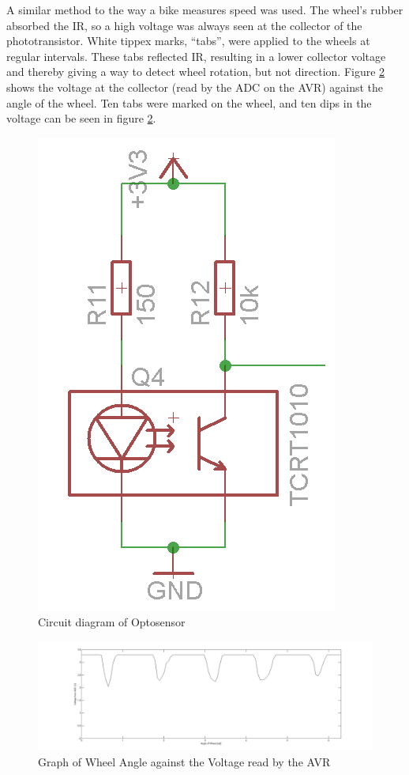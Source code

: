 A similar method to the way a bike measures speed was used. The wheel's rubber absorbed the IR, so a high voltage was always seen at the collector of the phototransistor. White tippex marks, ``tabs'', were applied to the wheels at regular intervals. These tabs reflected IR, resulting in a lower collector voltage and thereby giving a way to detect wheel rotation, but not direction. Figure \ref{Graph:WheelVoltage} shows the voltage at the collector (read by the ADC on the AVR) against the angle of the wheel. Ten tabs were marked on the wheel, and ten dips in the voltage can be seen in figure \ref{Graph:WheelVoltage}. 


\begin{figure}
\centering
\includegraphics[scale=0.5]{Figures/TCRT_Circuit.png}
\caption{Circuit diagram of Optosensor}
\label{Circuit:TCRT1010}
\end{figure}

\begin{figure}
\includegraphics[width = \textwidth]{Figures/WheelVoltageGraph.jpg}
\caption{Graph of Wheel Angle against the Voltage read by the AVR}
\label{Graph:WheelVoltage}
\end{figure}
 

